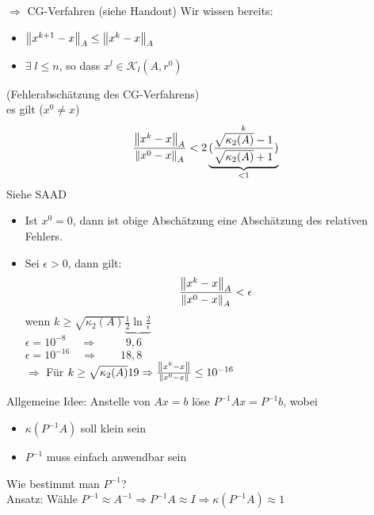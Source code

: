 $\Rightarrow$ CG-Verfahren (siehe Handout)
Wir wissen bereits:
\begin{itemize}
  \item $\left\lVert x^{k+1} - x \right\rVert_A \leq \left\lVert x^k - x \right\rVert_A$
  \item $\exists\; l \leq n$, so dass $x^l \in \mathcal{K}_l(A,r^0)$
\end{itemize}
\satz (Fehlerabschätzung des CG-Verfahrens)\\
es gilt ($x^0 \neq x$)
\begin{align*}
  \frac{\left\lVert x^k - x \right\rVert_A}{\left\lVert x^0 - x \right\rVert_A} < 2 \underbrace{(\frac{\sqrt{\kappa_2(A)} - 1}{\sqrt{\kappa_2(A)}+1} )}_{<1}^k
\end{align*}
\beweis Siehe SAAD
\begin{itemize}
  \item Ist $x^0 = 0$, dann ist obige Abschätzung eine Abschätzung des relativen Fehlers.
  \item Sei $\epsilon > 0$, dann gilt:
  \begin{align*}
    \frac{\left\lVert x^k - x \right\rVert_A}{\left\lVert x^0 - x \right\rVert_A} < \epsilon
  \end{align*}
  wenn $k \geq \sqrt{\kappa_2(A)} \underbrace{\frac{1}{2} \ln \frac{2}{\epsilon}}$\\
  $\epsilon = 10^{-8} \;\quad\Rightarrow\qquad \;\;9,6$\\
  $\epsilon = 10^{-16} \quad\Rightarrow\qquad 18,8$\\
  $\Rightarrow$ Für $k \geq \sqrt{\kappa_2(A)}19 \Rightarrow \frac{\left\lVert x^k - x \right\rVert}{\left\lVert x^0 - x \right\rVert} \leq 10^{-16}$
\end{itemize}
Allgemeine Idee: Anstelle von $Ax = b$ löse $P^{-1}Ax = P^{-1}b$, wobei
\begin{itemize}
  \item $\kappa(P^{-1}A)$ soll klein sein
  \item $P^{-1}$ muss einfach anwendbar sein
\end{itemize}
Wie bestimmt man $P^{-1}$?\\
Ansatz: Wähle $P^{-1}\approx A^{-1} \Rightarrow P^{-1}A \approx I \Rightarrow \kappa(P^{-1}A) \approx 1$
